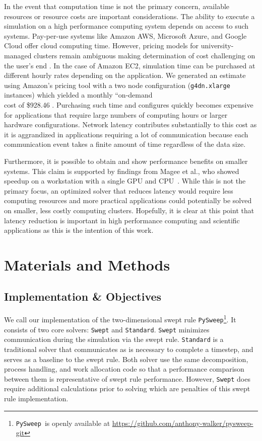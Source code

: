 \documentclass[preprints,article,accept,moreauthors,pdftex]{Definitions/mdpi}
\def\github{\url{https://github.com/anthony-walker/pysweep-git}}
\def\pysweep{\texttt{PySweep}}
\def\Swept{\texttt{Swept}}
\def\Standard{\texttt{Standard}}
\begin{document}
In the event that computation time is not the primary concern, available resources or resource costs are important considerations. The ability to execute a simulation on a high performance computing system depends on access to such systems. 
Pay-per-use systems like Amazon AWS, Microsoft Azure, and Google Cloud offer cloud computing time. However, pricing models for university-managed clusters remain ambiguous making determination of cost challenging on the user's end \cite{Mesnard2019}. 
In the case of Amazon EC2, simulation time can be purchased at different hourly rates depending on the application. We generated an estimate using Amazon's pricing tool with a two node configuration (\texttt{g4dn.xlarge} instances) which yielded a monthly ``on-demand\\ cost of \$928.46 \cite{AmazonServices}. 
Purchasing such time and configures quickly becomes expensive for applications that require large numbers of computing hours or larger hardware configurations. Network latency contributes substantially to this cost as it is aggrandized in applications requiring a lot of communication because each communication event takes a finite amount of time regardless of the data size. 

Furthermore, it is possible to obtain and show performance benefits on smaller systems. This claim is supported by findings from Magee et al., who showed speedup on a workstation with a single GPU and CPU~\cite{Magee2018AcceleratingDecomposition}. 
While this is not the primary focus, an optimized solver that reduces latency would require less computing resources and more practical applications could potentially be solved on smaller, less costly computing clusters. 
Hopefully, it is clear at this point that latency reduction is important in high performance computing and scientific applications as this is the intention of this work.


\section{Materials and Methods}
\label{methods-section}

\subsection{Implementation \& Objectives}

We call our implementation of the two-dimensional swept rule \pysweep{}\footnote{\pysweep~is openly available at \github}. It consists of two core solvers: \Swept{} and \Standard{}. \Swept{} minimizes communication during the simulation via the swept rule. \Standard{} is a traditional solver that communicates as is necessary to complete a timestep, and serves as a baseline to the swept rule. Both solver use the same decomposition, process handling, and work allocation code so that a performance comparison between them is representative of swept rule performance. However, \Swept{} does require additional calculations prior to solving which are penalties of this swept rule implementation. 
\end{document}
